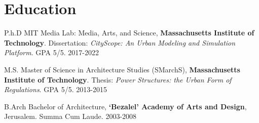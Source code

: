 \section*{Education}

\begin{tablist}

    \item[P.h.D] \tab MIT Media Lab: Media, Arts, and Science, \textbf{Massachusetts Institute of Technology}. Dissertation: \textit{CityScope: An Urban Modeling and Simulation Platform}. GPA 5/5. 2017-2022
    \item[M.S.] \tab Master of Science in Architecture Studies (SMarchS), \textbf{Massachusetts Institute of Technology}. Thesis: \textit{Power Structures: the Urban Form of Regulations}. GPA 5/5. 2013-2015
    \item[B.Arch]  \tab Bachelor of Architecture, \textbf{`Bezalel' Academy of Arts and Design}, Jerusalem. Summa Cum Laude. 2003-2008

\end{tablist}
